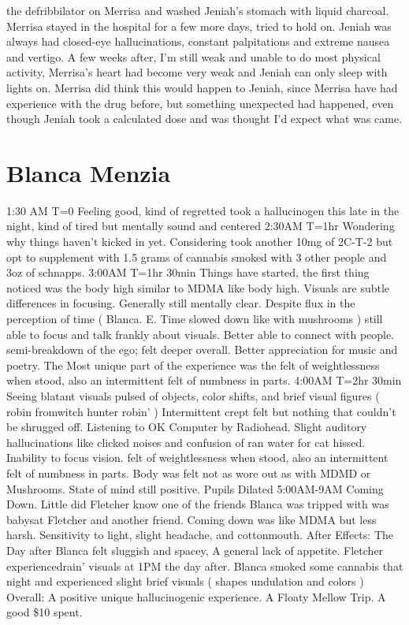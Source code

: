 \documentclass[12pt]{book}
\begin{document}
the defribbilator on Merrisa and washed Jeniah's stomach with liquid charcoal. Merrisa stayed in the hospital for a few more days, tried to hold on. Jeniah was always had closed-eye hallucinations, constant palpitations and extreme nausea and vertigo. A few weeks after, I'm still weak and unable to do most physical activity, Merrisa's heart had become very weak and Jeniah can only sleep with lights on. Merrisa did think this would happen to Jeniah, since Merrisa have had experience with the drug before, but something unexpected had happened, even though Jeniah took a calculated dose and was thought I'd expect what was came.



\chapter{Blanca Menzia}

1:30 AM T=0 Feeling good, kind of regretted took a hallucinogen this late in the night, kind of tired but mentally sound and centered 2:30AM T=1hr Wondering why things haven't kicked in yet. Considering took another 10mg of 2C-T-2 but opt to supplement with 1.5 grams of cannabis smoked with 3 other people and 3oz of schnapps. 3:00AM T=1hr 30min Things have started, the first thing noticed was the body high similar to MDMA like body high. Visuals are subtle differences in focusing. Generally still mentally clear. Despite flux in the perception of time ( Blanca. E. Time slowed down like with mushrooms ) still able to focus and talk frankly about visuals. Better able to connect with people. semi-breakdown of the ego; felt deeper overall. Better appreciation for music and poetry. The Most unique part of the experience was the felt of weightlessness when stood, also an intermittent felt of numbness in parts. 4:00AM T=2hr 30min Seeing blatant visuals pulsed of objects, color shifts, and brief visual figures ( robin fromwitch hunter robin' ) Intermittent crept felt but nothing that couldn't be shrugged off. Listening to OK Computer by Radiohead. Slight auditory hallucinations like clicked noises and confusion of ran water for cat hissed. Inability to focus vision. felt of weightlessness when stood, also an intermittent felt of numbness in parts. Body was felt not as wore out as with MDMD or Mushrooms. State of mind still positive. Pupils Dilated 5:00AM-9AM Coming Down. Little did Fletcher know one of the friends Blanca was tripped with was babysat Fletcher and another friend. Coming down was like MDMA but less harsh. Sensitivity to light, slight headache, and cottonmouth. After Effects: The Day after Blanca felt sluggish and spacey, A general lack of appetite. Fletcher experiencedrain' visuals at 1PM the day after. Blanca smoked some cannabis that night and experienced slight brief visuals ( shapes undulation and colors ) Overall: A positive unique hallucinogenic experience. A Floaty Mellow Trip. A good \$10 spent.
\end{document}
